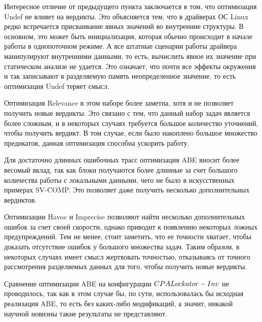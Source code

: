 Интересное отличие от предыдущего пункта заключается в том, что оптимизация Undef не влияет на вердикты.
Это объясняется тем, что в драйверах ОС Linux редко встречается присваивание явных значений во внутренние структуры.
В основном, это может быть инициализация, которая обычно происходит в начале работы в однопоточном режиме.
А все штатные сценарии работы драйвера манипулируют внутренними данными, то есть, вычислить явное их значение при статическом анализе не удается. 
Это означает, что почти все эффекты окружения и так записывают в разделяемую память неопределенное значение, то есть оптимизация Undef теряет смысл.

Оптимизация Relevance в этом наборе более заметна, хотя и не позволяет получить новые вердикты. 
Это связано с тем, что данный набор задач является более сложным, и в некоторых случаях требуется большое количество уточнений, чтобы получить вердикт.
В том случае, если было накоплено большое множество предикатов, данная оптимизация способна ускорить работу.

Для достаточно длинных ошибочных трасс оптимизация ABE вносит более весомый вклад, так как блоки получаются более длинные за счет большого количества работы с локальными данными, чего не было в искусственных примерах SV-COMP.
Это позволяет даже получить несколько дополнительных вердиктов.

Оптимизации Havoc и Imprecise позволяют найти несколько дополнительных ошибок за счет своей скорости, однако приводит к появлению некоторых ложных предупреждений.
Тем не менее, стоит заметить, что ее точности хватает, чтобы доказать отсутствие ошибок у большого множества задач. 
Таким образом, в некоторых случаях имеет смысл жертвовать точностью, отказываясь от точного рассмотрения разделяемых данных для того, чтобы получить новые вердикты.

Сравнение оптимизации ABE на конфигурации $CPALockator-Inv$ не проводилось, так как в этом случае бы, по сути, использовалась бы исходная реализация ABE, то есть без каких-либо модификаций, а значит, никакой научной новизны такие результаты не представляют.

